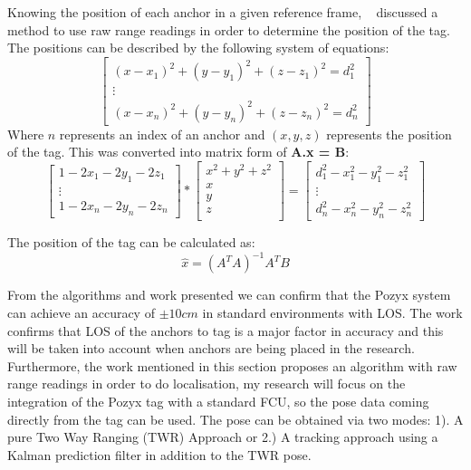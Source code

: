 Knowing the position of each anchor in a given reference frame, ~\citet{evaluwb} discussed a method to use raw range readings in order to determine the position of the tag.
The positions can be described by the following system of equations:
        \begin{equation}
                \left[
            \begin{array}{c}
                (x - x_1)^2 + (y - y_1)^2 + (z - z_1)^2 = d_1^2\\
                \vdots\\
                (x - x_n)^2 + (y - y_n)^2 + (z - z_n)^2 = d_n^2
            \end{array}
                \right]
        \end{equation}
        Where $n$ represents an index of an anchor and $(x,y,z)$ represents the position of the tag.
        This was converted into matrix form of \textbf{A.x = B}:
        \begin{equation}
            \left[
            \begin{array}{c}
                1 - 2x_1 -2y_1 -2z_1\\
                \vdots\\
                1 - 2x_n -2y_n -2z_n
            \end{array}
            \right]
        *
            \left[
                \begin{array}{c}
                    x^2 + y^2 +z^2\\
                    x\\
                    y\\
                    z\\
                \end{array}
            \right]
            =
        \left[
            \begin{array}{c}
                d_1^2 - x_1^2 - y_1^2 -z_1^2\\
                \vdots\\
                d_n^2 - x_n^2 - y_n^2 -z_n^2
            \end{array}
        \right]
       \end{equation}

        The position of the tag can be calculated as:
        \[
            \hat{x} = (A^{T}A)^{-1}A^{T}B
        \]

From the algorithms and work presented we can confirm that the Pozyx system can achieve an accuracy of $\pm10cm$ in standard environments with LOS.
The work confirms that LOS of the anchors to tag is a major factor in accuracy and this will be taken into account when anchors are being placed in the research.
Furthermore, the work mentioned in this section proposes an algorithm with raw range readings in order to do localisation, my research will focus on the integration of the Pozyx tag with a standard FCU, so the pose data coming directly from the tag can be used.
The pose can be obtained via two modes: 1). A pure Two Way Ranging (TWR) Approach or 2.) A tracking approach using a Kalman prediction filter in addition to the TWR pose.

